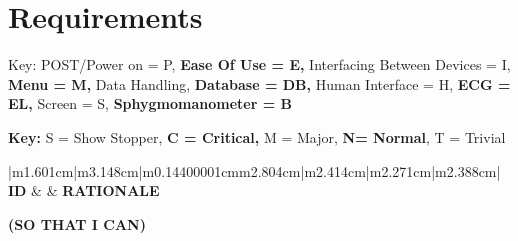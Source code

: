 \documentclass[a4paper]{article}
\title{}
\author{Harrison Marcks}
\date{2018-10-19}
\begin{document}
\clearpage\setcounter{page}{1}\pagestyle{Standard}
\section{Requirements}
{
Key: POST/Power on = P, \textbf{Ease Of Use = E,} Interfacing Between Devices = I, \textbf{Menu = M, }Data Handling,
\textbf{Database = DB, }Human Interface = H, \textbf{ECG = EL, }Screen = S, \textbf{Sphygmomanometer = B}}


\bigskip

{
\textbf{Key: }S = Show Stopper, \textbf{C = Critical, }M = Major, \textbf{N= Normal}, T = Trivial}

\begin{flushleft}
\tablefirsthead{}
\tablehead{}
\tabletail{}
\tablelasttail{}
\begin{supertabular}{|m{1.601cm}|m{3.148cm}|m{0.14400001cm}m{2.804cm}|m{2.414cm}|m{2.271cm}|m{2.388cm}|}
\hline
{\bfseries ID} &
 &
{\bfseries RATIONALE }

{\bfseries (SO THAT I CAN)}


\end{supertabular}
\end{flushleft}
\end{document}
